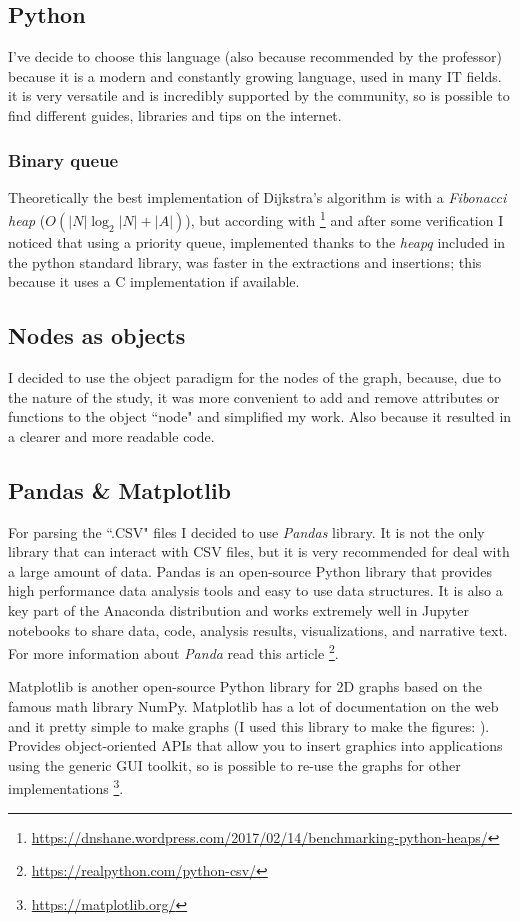 \documentclass[a4paper,11pt]{report}
\begin{document}
\subsection{Python}
I've decide to choose this language (also because recommended by the professor) because it is a modern and constantly growing language, used in many IT fields. it is very versatile and is incredibly supported by the community, so is possible to find different guides, libraries and tips on the internet.
\subsubsection{Binary queue}
Theoretically the best implementation of Dijkstra's algorithm is with a \textit{Fibonacci heap} ($O(|N|\log_2|N|+|A|)$), but according with \footnote{\url{https://dnshane.wordpress.com/2017/02/14/benchmarking-python-heaps/}} and after some verification I noticed that using a priority queue, implemented thanks to the \textit{heapq} included in the python standard library, was faster in the extractions and insertions; this because it uses a C implementation if available.

\subsection{Nodes as objects}
I decided to use the object paradigm for the nodes of the graph, because, due to the nature of the study, it was more convenient to add and remove attributes or functions to the object ``node" and simplified my work. Also because it resulted in a clearer and more readable code.
\subsection{Pandas \& Matplotlib}
For parsing the ``.CSV" files I decided to use \textit{Pandas} library. It is not the only library that can interact with CSV files, but it is very recommended for deal with a large amount of data.
Pandas is an open-source Python library that provides high performance data analysis tools and easy to use data structures. It is also a key part of the Anaconda distribution and works extremely well in Jupyter notebooks to share data, code, analysis results, visualizations, and narrative text. For more information about \textit{Panda} read this article \footnote{\url{https://realpython.com/python-csv/}}.
\vspace{5mm}

Matplotlib is another open-source Python library for 2D graphs based on the famous math library NumPy. Matplotlib has a lot of documentation on the web and it pretty simple to make graphs (I used this library to make the figures: ).
Provides object-oriented APIs that allow you to insert graphics into applications using the generic GUI toolkit, so is possible to re-use the graphs for other implementations \footnote{\url{https://matplotlib.org/}}.
\end{document}
